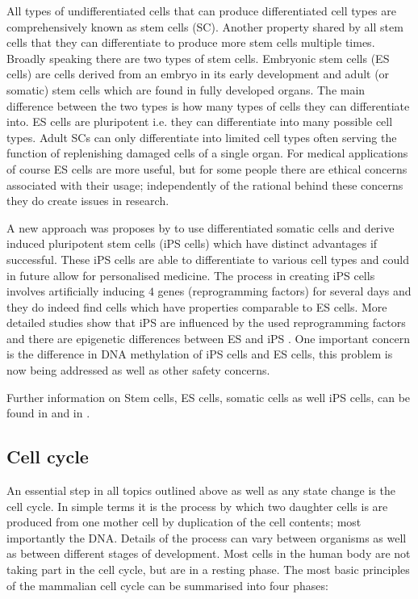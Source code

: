 All types of undifferentiated cells that can produce differentiated cell types are comprehensively known as stem cells (SC). Another property shared by all stem cells that they can differentiate to produce more stem cells multiple times. Broadly speaking there are two types of stem cells. Embryonic stem cells (ES cells) are cells derived from an embryo in its early development and  adult (or somatic) stem cells which are found in fully developed organs. The main difference between the two types is how many types of cells they can differentiate into. ES cells are pluripotent i.e. they can differentiate into many possible cell types. Adult SCs can only differentiate into limited cell types often serving the function of replenishing damaged cells of a single organ. For medical applications of course ES cells are more useful, but for some people there are ethical concerns associated with their usage; independently of the rational behind these concerns they do create issues in research.

A new approach was proposes by \cite{Takahashi:2006hi} to use differentiated somatic cells and derive induced pluripotent stem cells (iPS cells) which have distinct advantages if successful. These iPS cells are able to differentiate to various cell types and could in future allow for personalised medicine. The process in creating iPS cells involves artificially inducing $4$ genes (reprogramming factors) for several days and they do indeed find cells which have properties comparable to ES cells. More detailed studies show that iPS are influenced by the used reprogramming factors and there are epigenetic differences between ES and iPS \citep{Carey:2011bs, Bock:2011kx}. One important concern is the difference in DNA methylation of iPS cells and ES cells, this problem is now being addressed \citep{Bagci:2013ey} as well as other safety concerns.

Further information on Stem cells, ES cells, somatic cells as well iPS cells, can be found in \cite{lanza2009essentials} and in \cite{Lanza:2013uk}. 

\subsection{Cell cycle}
\label{sec:cell-cycle}

An essential step in all topics outlined above as well as any state change is the cell cycle. In simple terms it is the process by which two daughter cells is are produced from one mother cell by duplication of the cell contents; most importantly the DNA. Details of the process can vary between organisms as well as between different stages of development. Most cells in the human body are not taking part in the cell cycle, but are in a resting phase. The most basic principles of the mammalian cell cycle can be summarised into four phases:

